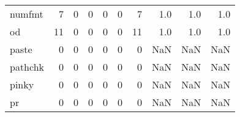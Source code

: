 \begin{tabular}{lrrrrrrrrr}
numfmt    &                                                  7 &                                                  0 &                                                  0 &                                                  0 &                                                  0 &                                                  7 &                                                1.0 &                                    1.0 &                                  1.0 \\
od        &                                                 11 &                                                  0 &                                                  0 &                                                  0 &                                                  0 &                                                 11 &                                                1.0 &                                    1.0 &                                  1.0 \\
paste     &                                                  0 &                                                  0 &                                                  0 &                                                  0 &                                                  0 &                                                  0 &                                                NaN &                                    NaN &                                  NaN \\
pathchk   &                                                  0 &                                                  0 &                                                  0 &                                                  0 &                                                  0 &                                                  0 &                                                NaN &                                    NaN &                                  NaN \\
pinky     &                                                  0 &                                                  0 &                                                  0 &                                                  0 &                                                  0 &                                                  0 &                                                NaN &                                    NaN &                                  NaN \\
pr        &                                                  0 &                                                  0 &                                                  0 &                                                  0 &                                                  0 &                                                  0 &                                                NaN &                                    NaN &                                  NaN \\

\end{tabular}
